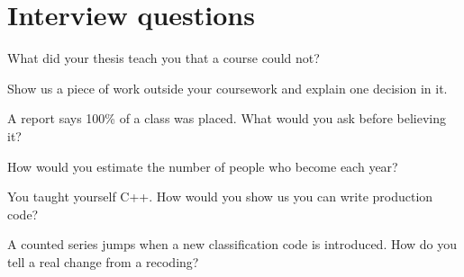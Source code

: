 \section{Interview questions}

\begin{interviewq}\label{iq:in:education-pipelines:1}
What did your thesis teach you that a course could not?
\end{interviewq}

\begin{interviewq}\label{iq:in:education-pipelines:2}
Show us a piece of work outside your coursework and explain one decision in it.
\end{interviewq}

\begin{interviewq}\label{iq:in:education-pipelines:3}
A report says 100\% of a class was placed. What would you ask before believing it?
\end{interviewq}

\begin{interviewq}\label{iq:in:education-pipelines:4}
How would you estimate the number of people who become  each year?
\end{interviewq}

\begin{interviewq}\label{iq:in:education-pipelines:5}
You taught yourself C++. How would you show us you can write production code?
\end{interviewq}

\begin{interviewq}\label{iq:in:education-pipelines:6}
A counted series jumps when a new classification code is introduced. How do you tell a real change from a recoding?
\end{interviewq}
